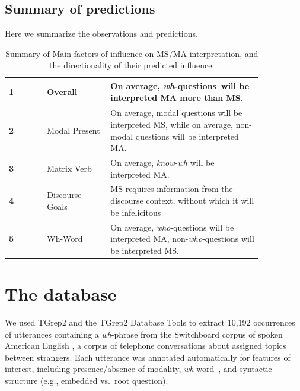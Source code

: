 \documentclass[12pt,letterpaper,table,svgnames,dvipsnames]{article}
\newcommand{\jd}[1]{\textcolor{Purple}{[jd: #1]}}
\newcommand{\mm}[1]{\textcolor{teal}{[mm: #1]}}
\newcommand{\whqs}{\emph{wh}-questions~}
\newcommand{\whw}{\emph{wh}-word~}
\begin{document}


\subsection{Summary of predictions}

Here we summarize the observations and predictions.
\begin{table}[h!]
    \centering
   \begin{tabular}{l p{0.25\linewidth} p{0.6\linewidth} }
    \toprule
    \textbf{1} & Overall & On average, \whqs will be interpreted MA more than MS.\\
    \midrule
    \textbf{2} & Modal Present & On average, modal questions will be interpreted MS, while on average, non-modal questions will be interpreted MA.\\
    \midrule
    \textbf{3} & Matrix Verb & On average, \emph{know-wh} will be interpreted MA.\\
    \midrule
    \textbf{4} & Discourse Goals & MS requires information from the discourse context, without which it will be infelicitous\\
    \midrule
    \textbf{5} & Wh-Word & On average, \emph{who}-questions will be interpreted MA, non-\emph{who}-questions will be interpreted MS.\\
    \bottomrule
   \end{tabular}
    \caption{Summary of Main factors of influence on MS/MA interpretation, and the directionality of their predicted influence.}
    \label{fig:my_label}
\end{table}


\newpage
\section{The database}

We used TGrep2 \cite{rohde2005tgrep2} and the TGrep2 Database Tools \cite{degen2011tgrep2} to extract 10,192 occurrences of utterances containing a \emph{wh}-phrase from the Switchboard corpus of spoken American English \cite{godholmcd1992}, a corpus of telephone conversations about assigned topics between strangers. Each utterance was annotated automatically for features of interest, including presence/absence of modality, \whw, and syntactic structure (e.g., embedded vs.~root question). 
\end{document}
